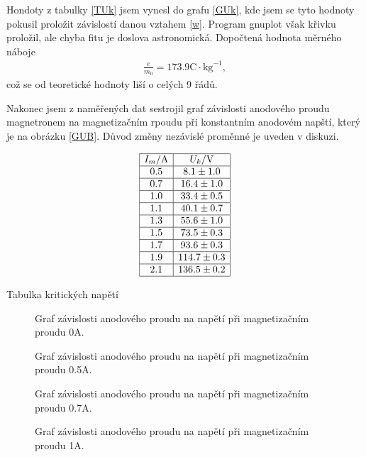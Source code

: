 \documentclass[a4paper,12pt]{article}
\begin{document}
Hondoty z tabulky \ref{TUk} jsem vynesl do grafu \ref{GUk}, kde jsem se tyto hodnoty pokusil proložit závislostí danou vztahem \ref{w}. Program gnuplot však křivku proložil, ale chyba fitu je doslova astronomická. 
Dopočtená hodnota měrného náboje
\begin{eqnarray}
\frac{e}{m_0}=173.9 \mbox{C}\cdot\mbox{kg}^{-1},
\end{eqnarray}
což se od teoretické hodnoty liší o celých 9 řádů.

Nakonec jsem z naměřených dat sestrojil graf závislosti anodového proudu magnetronem na magnetizačním rpoudu při konstantním anodovém napští, který je na obrázku \ref{GUB}. Důvod změny nezávislé proměnné je uveden v diskuzi.

\begin{table}
$$
\begin{array}{|c|c|}
\hline
I_m/\mbox{A}& U_k/\mbox{V} \\ \hline
0.5&    8.1\pm1.0 \\ \hline
0.7&    16.4\pm 1.0 \\ \hline
1.0&    33.4\pm 0.5 \\ \hline
1.1&    40.1\pm 0.7 \\ \hline
1.3&    55.6\pm 1.0 \\ \hline
1.5&    73.5\pm 0.3 \\ \hline
1.7&    93.6\pm 0.3 \\ \hline
1.9&    114.7\pm 0.3 \\ \hline
2.1&    136.5\pm 0.2 \\ \hline
\end{array}
$$
\caption{Tabulka kritických napětí}
\label{TUk}
\end{table}

\begin{figure}[h]

\caption{Graf závislosti anodového proudu na napětí při magnetizačním proudu 0A.}
\label{prvni}
\end{figure}

\begin{figure}[h]

\caption{Graf závislosti anodového proudu na napětí při magnetizačním proudu 0.5A.}
\end{figure}

\begin{figure}[h]

\caption{Graf závislosti anodového proudu na napětí při magnetizačním proudu 0.7A.}
\end{figure}

\begin{figure}[h]

\caption{Graf závislosti anodového proudu na napětí při magnetizačním proudu 1A.}
\end{figure}
\end{document}
